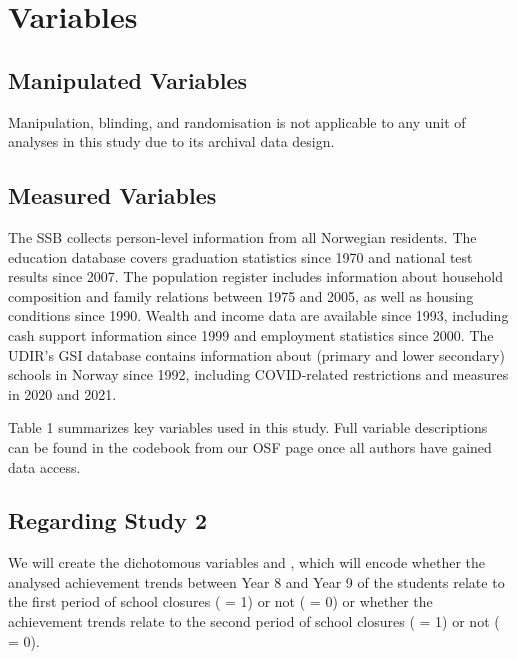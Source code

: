 \section{Variables}

\subsection{Manipulated Variables}
Manipulation, blinding, and randomisation is not applicable to any unit of analyses in this study due to its archival data design.

\subsection{Measured Variables}
The SSB collects person-level information from all Norwegian residents. The education database covers graduation statistics since 1970 and national test results since 2007. The population register includes information about household composition and family relations between 1975 and 2005, as well as housing conditions since 1990. Wealth and income data are available since 1993, including cash support information since 1999 and employment statistics since 2000. The UDIR's GSI database contains information about (primary and lower secondary) schools in Norway since 1992, including COVID-related restrictions and measures in 2020 and 2021.

Table 1 summarizes key variables used in this study. Full variable descriptions can be found in the codebook from our OSF page once all authors have gained data access.

\subsection{Regarding Study 2}
We will create the dichotomous variables  and , which will encode whether the analysed achievement trends between Year 8 and Year 9 of the students relate to the first period of school closures ( = 1) or not ( = 0) or whether the achievement trends relate to the second period of school closures ( = 1) or not ( = 0).

